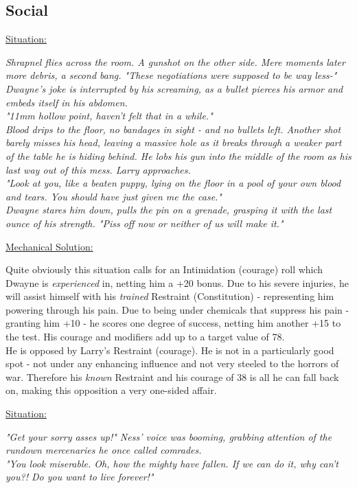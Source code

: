 \documentclass[12pt,a4paper,openany]{book}
\begin{document}
	\subsection*{Social}
	\ul{Situation:}
	\begin{exampleblock}
		\textit{Shrapnel flies across the room. A gunshot on the other side. Mere moments later more debris, a second bang.
		"These negotiations were supposed to be way less-"\\
		Dwayne's joke is interrupted by his screaming, as a bullet pierces his armor and embeds itself in his abdomen.\\
		"11mm hollow point, haven't felt that in a while."\\
		Blood drips to the floor, no bandages in sight - and no bullets left. Another shot barely misses his head, leaving a massive hole as it breaks through a weaker part of the table he is hiding behind. He lobs his gun into the middle of the room as his last way out of this mess. Larry approaches.\\
		"Look at you, like a beaten puppy, lying on the floor in a pool of your own blood and tears. You should have just given me the case."\\
		Dwayne stares him down, pulls the pin on a grenade, grasping it with the last ounce of his strength.
		"Piss off now or neither of us will make it."}
	\end{exampleblock}
	\ul{Mechanical Solution:}
	\begin{exampleblock}
		Quite obviously this situation calls for an Intimidation (courage) roll which Dwayne is \emph{experienced} in, netting him a +20 bonus. Due to his severe injuries, he will assist himself with his \emph{trained} Restraint (Constitution) - representing him powering through his pain. Due to being under chemicals that suppress his pain - granting him +10 - he scores one degree of success, netting him another +15 to the test. His courage and modifiers add up to a target value of 78.\\
		He is opposed by Larry's Restraint (courage). He is not in a particularly good spot - not under any enhancing influence and not very steeled to the horrors of war. Therefore his \emph{known} Restraint and his courage of 38 is all he can fall back on, making this opposition a very one-sided affair.
	\end{exampleblock}
	\breakline
	\ul{Situation:}
	\begin{exampleblock}
		\textit{"Get your sorry asses up!" Ness' voice was booming, grabbing attention of the rundown mercenaries he once called comrades.\\
		"You look miserable. Oh, how the mighty have fallen. If we can do it, why can't you?! Do you want to live forever!"}
	\end{exampleblock}
\end{document}
